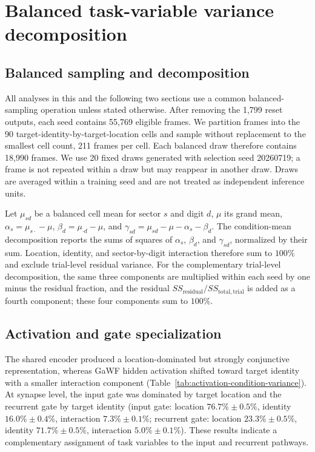 \section{Balanced task-variable variance decomposition}
\label{app:variance-decomposition}

\subsection{Balanced sampling and decomposition}

All analyses in this and the following two sections use a common balanced-sampling operation unless stated otherwise. After removing the 1,799 reset outputs, each seed contains 55,769 eligible frames. We partition frames into the 90 target-identity-by-target-location cells and sample without replacement to the smallest cell count, 211 frames per cell. Each balanced draw therefore contains 18,990 frames. We use 20 fixed draws generated with selection seed 20260719; a frame is not repeated within a draw but may reappear in another draw. Draws are averaged within a training seed and are not treated as independent inference units.

Let \(\mu_{sd}\) be a balanced cell mean for sector \(s\) and digit \(d\), \(\mu\) its grand mean, \(\alpha_s=\mu_{s\cdot}-\mu\), \(\beta_d=\mu_{\cdot d}-\mu\), and \(\gamma_{sd}=\mu_{sd}-\mu-\alpha_s-\beta_d\). The condition-mean decomposition reports the sums of squares of \(\alpha_s\), \(\beta_d\), and \(\gamma_{sd}\), normalized by their sum. Location, identity, and sector-by-digit interaction therefore sum to \(100\%\) and exclude trial-level residual variance. For the complementary trial-level decomposition, the same three components are multiplied within each seed by one minus the residual fraction, and the residual \(SS_{\mathrm{residual}}/SS_{\mathrm{total,trial}}\) is added as a fourth component; these four components sum to \(100\%\).

\subsection{Activation and gate specialization}

The shared encoder produced a location-dominated but strongly conjunctive representation, whereas GaWF hidden activation shifted toward target identity with a smaller interaction component (Table~\ref{tab:activation-condition-variance}). At synapse level, the input gate was dominated by target location and the recurrent gate by target identity (input gate: location \(76.7\%\pm0.5\%\), identity \(16.0\%\pm0.4\%\), interaction \(7.3\%\pm0.1\%\); recurrent gate: location \(23.3\%\pm0.5\%\), identity \(71.7\%\pm0.5\%\), interaction \(5.0\%\pm0.1\%\)). These results indicate a complementary assignment of task variables to the input and recurrent pathways.


